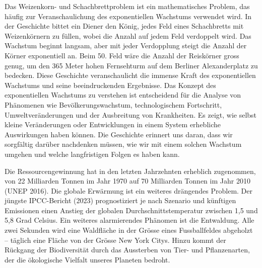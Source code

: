 \documentclass[
  nswissgerman,
  a4paper,
  DIV=11,
  numbers=noendperiod,
  oneside,
  openany]{scrreprt}
\begin{document}
\begin{tcolorbox}[enhanced jigsaw, arc=.35mm, bottomrule=.15mm, bottomtitle=1mm, breakable, colback=white, colbacktitle=quarto-callout-tip-color!10!white, colframe=quarto-callout-tip-color-frame, coltitle=black, left=2mm, leftrule=.75mm, opacityback=0, opacitybacktitle=0.6, rightrule=.15mm, title={Das Weizenkorn- und Schachbrettproblem: eine Illustration des
exponentiellen Wachstums}, titlerule=0mm, toprule=.15mm, toptitle=1mm]

Das Weizenkorn- und Schachbrettproblem ist ein mathematisches Problem,
das häufig zur Veranschaulichung des exponentiellen Wachstums verwendet
wird. In der Geschichte bittet ein Diener den König, jedes Feld eines
Schachbretts mit Weizenkörnern zu füllen, wobei die Anzahl auf jedem
Feld verdoppelt wird. Das Wachstum beginnt langsam, aber mit jeder
Verdopplung steigt die Anzahl der Körner exponentiell an. Beim 50. Feld
wäre die Anzahl der Reiskörner gross genug, um den 365 Meter hohen
Fernsehturm auf dem Berliner Alexanderplatz zu bedecken. Diese
Geschichte veranschaulicht die immense Kraft des exponentiellen
Wachstums und seine beeindruckenden Ergebnisse. Das Konzept des
exponentiellen Wachstums zu verstehen ist entscheidend für die Analyse
von Phänomenen wie Bevölkerungswachstum, technologischem Fortschritt,
Umweltveränderungen und der Ausbreitung von Krankheiten. Es zeigt, wie
selbst kleine Veränderungen oder Entwicklungen in einem System
erhebliche Auswirkungen haben können. Die Geschichte erinnert uns daran,
dass wir sorgfältig darüber nachdenken müssen, wie wir mit einem solchen
Wachstum umgehen und welche langfristigen Folgen es haben kann.

\end{tcolorbox}

Die Ressourcengewinnung hat in den letzten Jahrzehnten erheblich
zugenommen, von 22 Milliarden Tonnen im Jahr 1970 auf 70 Milliarden
Tonnen im Jahr 2010 (UNEP 2016). Die globale Erwärmung ist ein weiteres
drängendes Problem. Der jüngste IPCC-Bericht (2023) prognostiziert je
nach Szenario und künftigen Emissionen einen Anstieg der globalen
Durchschnittstemperatur zwischen 1,5 und 5,8 Grad Celsius. Ein weiteres
alarmierendes Phänomen ist die Entwaldung. Alle zwei Sekunden wird eine
Waldfläche in der Grösse eines Fussballfeldes abgeholzt -- täglich eine
Fläche von der Grösse New York Citys. Hinzu kommt der Rückgang der
Biodiversität durch das Aussterben von Tier- und Pflanzenarten, der die
ökologische Vielfalt unseres Planeten bedroht.
\end{document}
